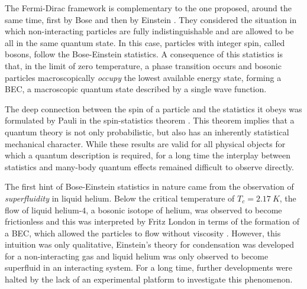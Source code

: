 The Fermi-Dirac framework is complementary to the one proposed, around the same time, first by Bose \cite{Bose1924pgu} and then by Einstein \cite{Einstein1924qde}. They considered the situation in which non-interacting particles are fully indistinguishable and are allowed to be all in the same quantum state. In this case, particles with integer spin, called bosons, follow the Bose-Einstein statistics.  A consequence of this statistics is that, in the limit of zero temperature, a   phase transition occurs and bosonic particles macroscopically \textit{occupy} the lowest available energy state, forming a \ac{BEC}, a macroscopic quantum state described by a single wave function. 

The deep connection between the spin of a particle and the statistics it obeys was formulated by Pauli in the spin-statistics theorem \cite{Pauli1940tcb}. This theorem implies that a quantum theory is not only probabilistic, but also has an inherently statistical mechanical character. While these results are valid for all physical objects for which a quantum description is required, for a long time the interplay between statistics and many-body quantum effects remained difficult to observe directly.

The first hint of Bose-Einstein statistics in nature came from the observation of \textit{superfluidity} in liquid helium. Below the critical temperature of $T_c=\SI{2.17}{K}$, the flow of liquid helium-$4$, a bosonic isotope of helium, was observed to become frictionless \cite{Kapitza1938vol, Allen1938fpi} and this was interpreted by Fritz London in terms of the formation of a \ac{BEC}, which allowed the particles to flow without viscosity \cite{London1938tlp}. However, this intuition was only qualitative, Einstein's theory for condensation was developed for a non-interacting gas and liquid helium was only observed to become superfluid in an interacting system. For a long time, further developments were halted by the lack of an experimental platform to investigate this phenomenon.

